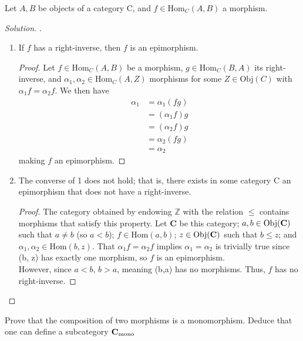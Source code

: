 \documentclass[12pt]{article}
\newenvironment{problem}[2][Problem]{\begin{trivlist}
\item[\hskip \labelsep {\bfseries #1}\hskip \labelsep {\bfseries #2.}]}{\end{trivlist}}
\newcommand{\catname}[1]{\normalfont\textbf{#1}}
\newcommand{\Hom}{\text{Hom}}
\newcommand{\Obj}[1]{\text{Obj}(\catname{C})}
\newenvironment{solution}
  {\renewcommand\qedsymbol{$\blacksquare$}\begin{proof}[Solution]}
        {\end{proof}}
\begin{document}
\begin{problem}{4.3}
  Let $A,B$ be objects of a category C, and $f\in \text{Hom}_C(A,B)$ a morphism.
\end{problem}
\begin{solution}.
  \begin{enumerate}
    \item If $f$ has a right-inverse, then $f$ is an epimorphism.
      \begin{proof}
        Let $f\in \text{Hom}_C(A,B)$ be a morphism, $g\in \text{Hom}_C(B,A)$ its right-inverse, and $\alpha_1, \alpha_2 \in \text{Hom}_C(A,Z)$ morphisms for some $Z\in \text{Obj}(C)$ with $\alpha_1f=\alpha_2f$.
        We then have
        \begin{align*}
          \alpha_1 &= \alpha_1(fg)\\
          &= (\alpha_1f)g\\
          &= (\alpha_2f)g\\
          &= \alpha_2(fg)\\
          &= \alpha_2
        \end{align*}
        making $f$ an epimorphism.
      \end{proof}
    \item The converse of 1 does not hold; that is, there exists in some category C an epimorphism that does not have a right-inverse.
      \begin{proof}
        The category obtained by endowing $\mathbb{Z}$ with the relation $\leq$ contains morphisms that satisfy this property.
        Let \catname{C} be this category; $a, b \in \Obj{C}$ such that $a\neq b$ (so $a < b$); $f \in \Hom(a, b)$; $z \in \Obj{C}$ such that $b \leq z$; and $\alpha_1, \alpha_2 \in \Hom(b, z)$. 
        That $\alpha_1f = \alpha_2f$ implies $\alpha_1=\alpha_2$ is trivially true since \Hom(b, z) has exactly one morphism, so $f$ is an epimorphism. \\
        However, since $a < b$, $b > a$, meaning \Hom(b,a) has no morphisms. Thus, $f$ has no right-inverse.

      \end{proof}
  \end{enumerate}
\end{solution}

\newpage

\begin{problem}{4.4}
  Prove that the composition of two morphisms is a monomorphism. Deduce that one can define a subcategory $\catname{C}_{\text{mono}}$
\end{problem}
\end{document}
